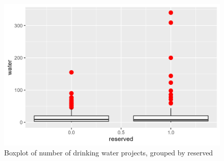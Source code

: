 \documentclass[12pt,letterpaper]{article}
\begin{document}
\begin{figure}[h!]
	\caption{\footnotesize{Boxplot of number of drinking water projects, grouped by reserved}}
	\vspace{.5cm}
	\centering
	\label{fig:water_reserved}
	\includegraphics[width=1.0\textwidth]{water_boxplot.png}
\end{figure}		

\newpage
{}
	  
\end{document}
